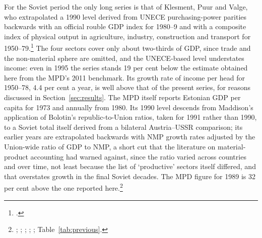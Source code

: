 \documentclass[12pt,a4paper]{article}
\begin{document}
For the Soviet period the only long series is that of Klesment, Puur and Valge, who extrapolated a 1990 level derived from UNECE purchasing-power parities backwards with an official rouble GDP index for 1980--9 and with a composite index of physical output in agriculture, industry, construction and transport for 1950--79.\footnote{\autocite[39--44]{klesment2010}.} The four sectors cover only about two-thirds of GDP, since trade and the non-material sphere are omitted, and the UNECE-based level understates income: even in 1995 the series stands 19 per cent below the estimate obtained here from the MPD's 2011 benchmark. Its growth rate of income per head for 1950--78, 4.4 per cent a year, is well above that of the present series, for reasons discussed in Section~\ref{sec:results}. The MPD itself reports Estonian GDP per capita for 1973 and annually from 1980. Its 1990 level descends from Maddison's application of Bolotin's republic-to-Union ratios, taken for 1991 rather than 1990, to a Soviet total itself derived from a bilateral Austria--USSR comparison; its earlier years are extrapolated backwards with NMP growth rates adjusted by the Union-wide ratio of GDP to NMP, a short cut that the literature on material-product accounting had warned against, since the ratio varied across countries and over time, not least because the list of `productive' sectors itself differed, and that overstates growth in the final Soviet decades. The MPD figure for 1989 is 32 per cent above the one reported here.\footnote{\autocite[181--2]{maddisonworldeconomy}; \autocite[307--8, 318]{Maddison1998b}; \autocite[593]{ceska1989}; \autocite{Campbell1985}; \autocite[279--80]{vonyoinmorys2021}; Table~\ref{tab:previous}.}








\newpage
{\sloppy\printbibliography}

\newpage

\end{document}
